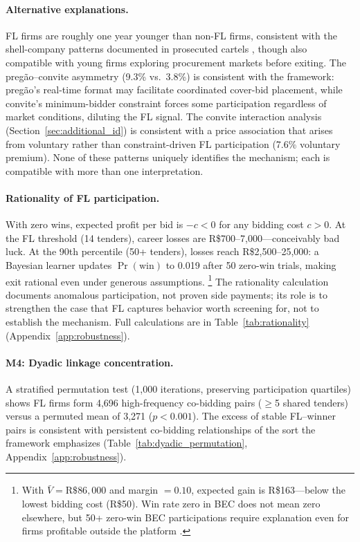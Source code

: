 \paragraph{Alternative explanations.}
FL firms are roughly one year younger than non-FL firms, consistent
with the shell-company patterns documented in prosecuted cartels
\citep{marshall2012economics}, though also compatible with young
firms exploring procurement markets before exiting. The
preg\~ao--convite asymmetry (9.3\% vs.\ 3.8\%) is consistent with
the framework: preg\~ao's real-time format may facilitate coordinated
cover-bid placement, while convite's minimum-bidder constraint forces
some participation regardless of market conditions, diluting the FL
signal. The convite interaction analysis
(Section~\ref{sec:additional_id}) is consistent with a price
association that arises from voluntary rather than constraint-driven
FL participation (7.6\% voluntary premium). None of these patterns
uniquely identifies the mechanism; each is compatible with more than
one interpretation.

\paragraph{Rationality of FL participation.}
\label{sec:rationality}
With zero wins, expected profit per bid is $-c < 0$ for any bidding
cost $c > 0$. At the FL threshold (14 tenders), career losses are
R\$700--7,000---conceivably bad luck. At the 90th percentile (50+
tenders), losses reach R\$2,500--25,000: a Bayesian learner updates
$\Pr(\text{win})$ to 0.019 after 50 zero-win trials, making exit
rational even under generous assumptions.%
\footnote{With $\bar{V} = \text{R\$}86{,}000$ and margin $= 0.10$,
expected gain is R\$163---below the lowest bidding cost (R\$50).
Win rate zero in BEC does not mean zero elsewhere, but 50+ zero-win
BEC participations require explanation even for firms profitable
outside the platform \citep{asker2010leniency, marshall2012economics}.}
The rationality calculation documents anomalous participation, not
proven side payments; its role is to strengthen the case that FL
captures behavior worth screening for, not to establish the
mechanism. Full calculations are in Table~\ref{tab:rationality}
(Appendix~\ref{app:robustness}).

\paragraph{M4: Dyadic linkage concentration.}
A stratified permutation test (1,000 iterations, preserving
participation quartiles) shows FL firms form 4,696 high-frequency
co-bidding pairs ($\geq$5 shared tenders) versus a permuted mean of
3,271 ($p < 0.001$). The excess of stable FL--winner pairs is consistent with
persistent co-bidding relationships of the sort the framework
emphasizes
(Table~\ref{tab:dyadic_permutation}, Appendix~\ref{app:robustness}).

